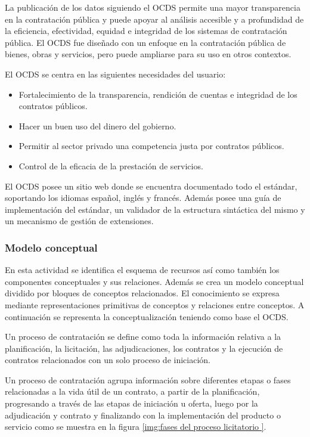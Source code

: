 La publicación de los datos siguiendo el OCDS permite una mayor transparencia en la contratación pública y puede apoyar al análisis accesible y a profundidad de la eficiencia, efectividad, equidad e integridad de los sistemas de contratación pública. El OCDS fue diseñado con un enfoque en la contratación pública de bienes, obras y servicios, pero puede ampliarse para su uso en otros contextos. 

El OCDS se centra en las siguientes necesidades del usuario:
\begin{itemize}
    \item Fortalecimiento de la transparencia, rendición de cuentas e integridad de los contratos públicos.
    \item Hacer un buen uso del dinero del gobierno.
    \item Permitir al sector privado una competencia justa por contratos públicos.
    \item Control de la eficacia de la prestación de servicios. 
\end{itemize}

El OCDS posee un sitio web donde se encuentra documentado todo el estándar, soportando los idiomas español, inglés y francés. Además posee una guía de implementación del estándar, un validador de la estructura sintáctica del mismo y un mecanismo de gestión de extensiones.

\subsubsection{Modelo conceptual}

En esta actividad se identifica el esquema de recursos así como también los componentes conceptuales y sus relaciones. Además se crea un modelo conceptual dividido por bloques de conceptos relacionados. El conocimiento se expresa mediante representaciones primitivas de conceptos y relaciones entre conceptos. A continuación se representa la conceptualización teniendo como base el OCDS.

Un proceso de contratación se define como toda la información relativa a la planificación, la licitación, las adjudicaciones, los contratos y la ejecución de contratos relacionados con un solo proceso de iniciación.

Un proceso de contratación agrupa información sobre diferentes etapas o fases relacionadas a la vida útil de un contrato, a partir de la planificación, progresando a través de las etapas de iniciación u oferta, luego por la adjudicación y contrato y finalizando con la implementación del producto o servicio como se muestra en la figura \ref{img:fases del proceso licitatorio }.

